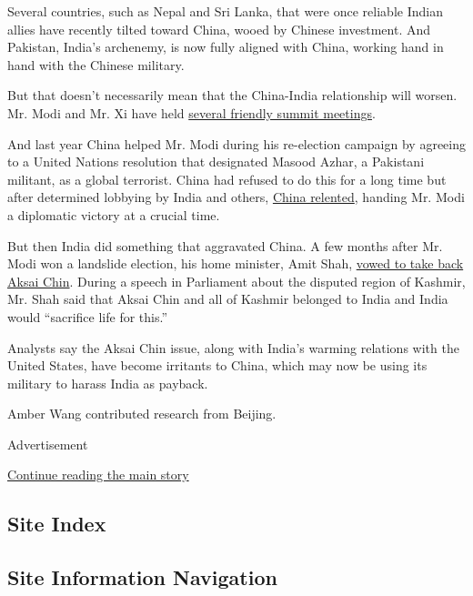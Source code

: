 Several countries, such as Nepal and Sri Lanka, that were once reliable
Indian allies have recently tilted toward China, wooed by Chinese
investment. And Pakistan, India's archenemy, is now fully aligned with
China, working hand in hand with the Chinese military.

But that doesn't necessarily mean that the China-India relationship will
worsen. Mr. Modi and Mr. Xi have held
\href{https://www.nytimes.com/2019/10/11/world/asia/narendra-modi-xi-jinping-india-china.html}{several
friendly summit meetings}.

And last year China helped Mr. Modi during his re-election campaign by
agreeing to a United Nations resolution that designated Masood Azhar, a
Pakistani militant, as a global terrorist. China had refused to do this
for a long time but after determined lobbying by India and others,
\href{https://www.lowyinstitute.org/the-interpreter/masood-azhar-global-terrorist-and-implications-pakistan}{China
relented}, handing Mr. Modi a diplomatic victory at a crucial time.

But then India did something that aggravated China. A few months after
Mr. Modi won a landslide election, his home minister, Amit Shah,
\href{https://economictimes.indiatimes.com/news/politics-and-nation/pok-aksai-chin-part-of-jammu-and-kashmir-will-sacrifice-our-lives-for-it-amit-shah-in-lok-sabha/videoshow/70550153.cms?from=mdr}{vowed
to take back Aksai Chin}. During a speech in Parliament about the
disputed region of Kashmir, Mr. Shah said that Aksai Chin and all of
Kashmir belonged to India and India would ``sacrifice life for this.''

Analysts say the Aksai Chin issue, along with India's warming relations
with the United States, have become irritants to China, which may now be
using its military to harass India as payback.

Amber Wang contributed research from Beijing.

Advertisement

\protect\hyperlink{after-bottom}{Continue reading the main story}

\hypertarget{site-index}{%
\subsection{Site Index}\label{site-index}}

\hypertarget{site-information-navigation}{%
\subsection{Site Information
Navigation}\label{site-information-navigation}}

